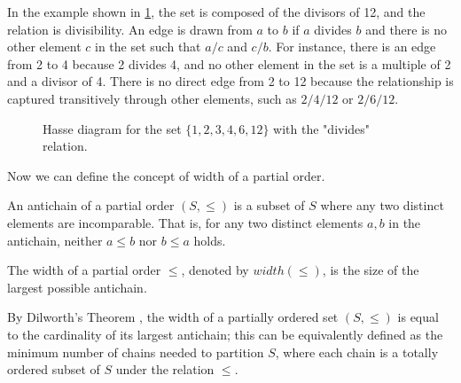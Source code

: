 \begin{example} \label{ex:hasse}
    In the example shown in \cref{fig:hasse_diagram_example}, the set is composed of the divisors of 12, and the relation is divisibility. An edge is drawn from $a$ to $b$ if $a$ divides $b$ and there is no other element $c$ in the set such that $a/c$ and $c/b$. For instance, there is an edge from 2 to 4 because 2 divides 4, and no other element in the set is a multiple of 2 and a divisor of 4. There is no direct edge from 2 to 12 because the relationship is captured transitively through other elements, such as $2/4/12$ or $2/6/12$.
    \begin{figure}[H]
        \centering
        \caption{Hasse diagram for the set $\{1, 2, 3, 4, 6, 12\}$ with the "divides" relation.}
        \label{fig:hasse_diagram_example}
    \end{figure}
\end{example}

Now we can define the concept of width of a partial order.

\begin{definition}[Antichain]
    An antichain of a partial order $(S, \leq)$ is a subset of $S$ where any two distinct elements are incomparable. That is, for any two distinct elements $a, b$ in the antichain, neither $a \leq b$ nor $b \leq a$ holds.
\end{definition}

\begin{definition}
    The width of a partial order $\leq$, denoted by $width(\leq)$, is the size of the largest possible antichain.
\end{definition}

By Dilworth's Theorem \cite{dilworth1990decomposition}, the width of a partially ordered set $(S, \leq)$ is equal to the cardinality of its largest antichain; this can be equivalently defined as the minimum number of chains needed to partition $S$, where each chain is a totally ordered subset of $S$ under the relation $\leq$. 


